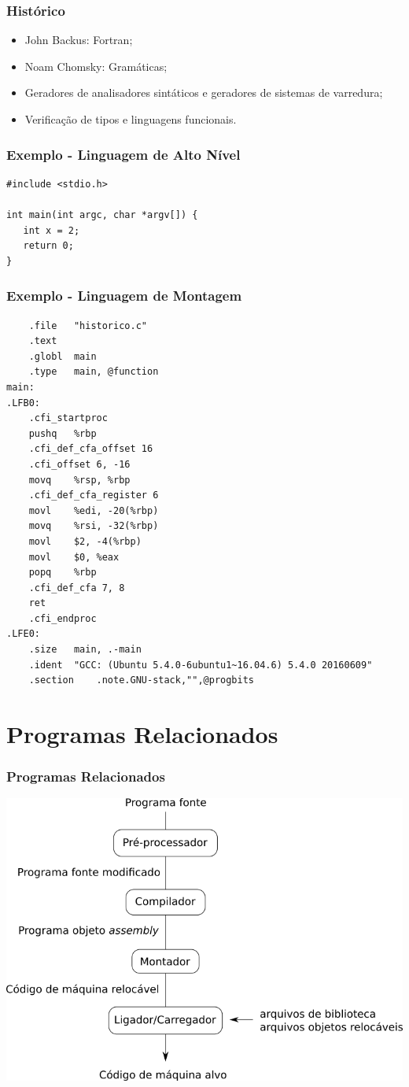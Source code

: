 \documentclass[table]{beamer}
\begin{document}
\begin{frame}
   \frametitle{Histórico}
   \begin{itemize}
      \item John Backus: Fortran;
      \item Noam Chomsky: Gramáticas;
      \item Geradores de analisadores sintáticos e geradores de sistemas de varredura;
      \item Verificação de tipos e linguagens funcionais.
   \end{itemize}
\end{frame}

\begin{frame}[fragile]
   \frametitle{Exemplo - Linguagem de Alto Nível}
   \begin{verbatim}
#include <stdio.h>

int main(int argc, char *argv[]) {
   int x = 2;
   return 0;
}
   \end{verbatim}
\end{frame}

\begin{frame}[fragile]
   \frametitle{Exemplo - Linguagem de Montagem}
   \scriptsize
   \begin{verbatim}
	.file	"historico.c"
	.text
	.globl	main
	.type	main, @function
main:
.LFB0:
	.cfi_startproc
	pushq	%rbp
	.cfi_def_cfa_offset 16
	.cfi_offset 6, -16
	movq	%rsp, %rbp
	.cfi_def_cfa_register 6
	movl	%edi, -20(%rbp)
	movq	%rsi, -32(%rbp)
	movl	$2, -4(%rbp)
	movl	$0, %eax
	popq	%rbp
	.cfi_def_cfa 7, 8
	ret
	.cfi_endproc
.LFE0:
	.size	main, .-main
	.ident	"GCC: (Ubuntu 5.4.0-6ubuntu1~16.04.6) 5.4.0 20160609"
	.section	.note.GNU-stack,"",@progbits
   \end{verbatim}
\end{frame}

\section{Programas Relacionados}

\begin{frame}
   \frametitle{Programas Relacionados}
   \includegraphics[width=\linewidth,height=\textheight,keepaspectratio]{figuras/programasrelacionados.png}
\end{frame}
\end{document}
